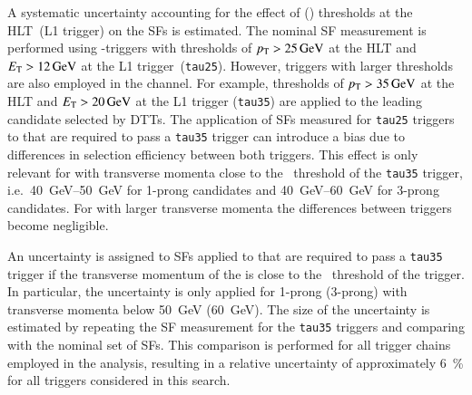 A systematic uncertainty accounting for the effect of \tauhadvis \pT (\ET)
thresholds at the HLT~(L1 trigger) on the \faketauhadvis SFs is estimated. The
nominal SF measurement is performed using \tauhadvis-triggers with thresholds of
$p_{\text{T}} > \SI{25}{\ensuremath{\text{GeV}}}$ at the HLT and $\ET > \SI{12}{\GeV}$ at the L1
trigger~(\texttt{tau25}). However, triggers with larger thresholds are also
employed in the \hadhad channel. For example, thresholds of
$p_{\text{T}} > \SI{35}{\ensuremath{\text{GeV}}}$ at the HLT and $\ET > \SI{20}{\GeV}$ at the L1 trigger
(\texttt{tau35}) are applied to the leading \tauhadvis candidate selected by
DTTs. The application of SFs measured for \texttt{tau25} triggers to
\faketauhadvis that are required to pass a \texttt{tau35} trigger can introduce
a bias due to differences in selection efficiency between both triggers. This
effect is only relevant for \faketauhadvis with transverse momenta close to the
\pT~threshold of the \texttt{tau35} trigger, i.e.\
\SIrange[range-phrase=--]{40}{50}{\GeV} for 1-prong candidates and
\SIrange[range-phrase=--]{40}{60}{\GeV} for 3-prong candidates. For
\faketauhadvis with larger transverse momenta the differences between triggers
become negligible.


An uncertainty is assigned to SFs applied to \faketauhadvis that are required to
pass a \texttt{tau35} trigger if the transverse momentum of the \faketauhadvis
is close to the \pT~threshold of the trigger. In particular, the uncertainty is
only applied for 1-prong (3-prong) \faketauhadvis with transverse momenta below
\SI{50}{\GeV} (\SI{60}{\GeV}). The size of the uncertainty is estimated by
repeating the SF measurement for the \texttt{tau35} triggers and comparing with
the nominal set of SFs. This comparison is performed for all trigger chains
employed in the analysis, resulting in a relative uncertainty of approximately
\SI{6}{\percent} for all triggers considered in this search.

